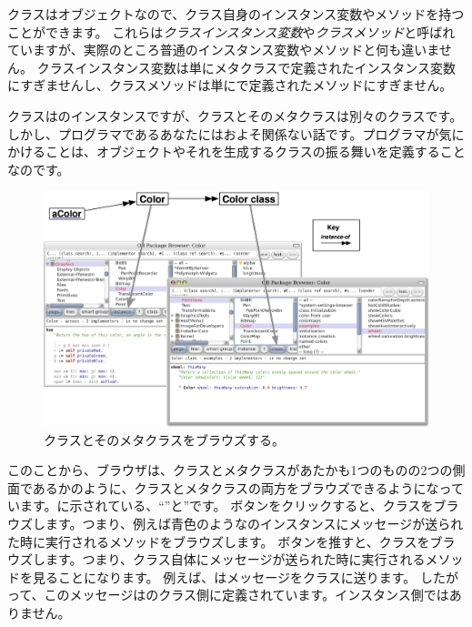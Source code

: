 \documentclass[a4paper,10pt,twoside]{book}
\begin{document}
クラスはオブジェクトなので、クラス自身のインスタンス変数やメソッドを持つことができます。
これらは\emph{クラスインスタンス変数}や\emph{クラスメソッド}と呼ばれていますが、実際のところ普通のインスタンス変数やメソッドと何も違いません。
クラスインスタンス変数は単にメタクラスで定義されたインスタンス変数にすぎませんし、クラスメソッドは単にで定義されたメソッドにすぎません。

クラスはのインスタンスですが、クラスとそのメタクラスは別々のクラスです。
しかし、プログラマであるあなたにはおよそ関係ない話です。プログラマが気にかけることは、オブジェクトやそれを生成するクラスの振る舞いを定義することなのです。

\begin{figure}[htb]
\begin{center}
\includegraphics[width=\textwidth]{Color-Buttons}
\caption{クラスとそのメタクラスをブラウズする。
}
\end{center}
\end{figure}

このことから、ブラウザは、クラスとメタクラスがあたかも1つのものの2つの側面であるかのように、クラスとメタクラスの両方をブラウズできるようになっています。に示されている、``''と''です。
ボタンをクリックすると、クラスをブラウズします。つまり、例えば青色のようなのインスタンスにメッセージが送られた時に実行されるメソッドをブラウズします。
ボタンを推すと、クラスをブラウズします。つまり、クラス自体にメッセージが送られた時に実行されるメソッドを見ることになります。
例えば、はメッセージをクラスに送ります。
したがって、このメッセージはのクラス側に定義されています。インスタンス側ではありません。
\end{document}
